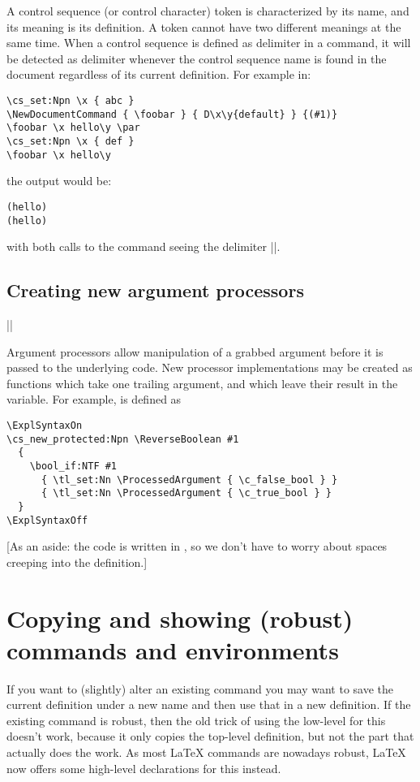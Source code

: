 \documentclass{ltxguide}
\begin{document}
A control sequence (or control character) token is characterized by
its name, and its meaning is its definition.
A token cannot have two different meanings at the same time.
When a control sequence is defined as delimiter in a command,
it will be detected as delimiter whenever the control sequence name
is found in the document regardless of its current definition.
For example in:
\begin{verbatim}
\cs_set:Npn \x { abc }
\NewDocumentCommand { \foobar } { D\x\y{default} } {(#1)}
\foobar \x hello\y \par
\cs_set:Npn \x { def }
\foobar \x hello\y
\end{verbatim}
the output would be:
\begin{verbatim}
(hello)
(hello)
\end{verbatim}
with both calls to the command seeing the delimiter |\x|.

\subsection{Creating new argument processors}

\begin{decl}
  |\ProcessedArgument|
\end{decl}
Argument processors allow manipulation of a grabbed argument before it is
passed to the underlying code. New processor implementations may be created
as functions which take one trailing argument, and which leave their result in
the  variable. For example,  is
defined as
\begin{verbatim}
\ExplSyntaxOn
\cs_new_protected:Npn \ReverseBoolean #1
  {
    \bool_if:NTF #1
      { \tl_set:Nn \ProcessedArgument { \c_false_bool } }
      { \tl_set:Nn \ProcessedArgument { \c_true_bool } }
  }
\ExplSyntaxOff
\end{verbatim}
[As an aside: the code is written in , so we don't have to
  worry about spaces creeping into the definition.]

\section{Copying and showing (robust) commands and environments}

If you want to (slightly) alter an existing command you may want to
save the current definition under a new name and then use that in a
new definition. If the existing command is robust, then the old trick of
using the low-level  for this doesn't work, because it only
copies the top-level definition, but not the part that actually does
the work. As most \LaTeX{} commands are nowadays robust, \LaTeX{}
now offers some high-level declarations for this instead.
\end{document}
